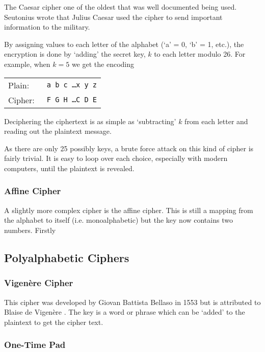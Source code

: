The Caesar cipher one of the oldest that was well documented being used. Seutonius wrote that Julius Caesar used the cipher to send important information to the military. 

By assigning values to each letter of the alphabet (`a' = 0, `b' = 1, etc.), the encryption is done by `adding' the secret key, $k$ to each letter modulo 26. For example, when $k = 5$ we get the encoding

\begin{center}
\begin{tabular}{l l}%
	Plain:  &\quad\texttt{ a b c \ldots x y z} \\ 
	Cipher: &\quad\texttt{ F G H \ldots C D E} \\
\end{tabular}
\end{center}

Deciphering the ciphertext is as simple as `subtracting' $k$ from each letter and reading out the plaintext message.

As there are only 25 possibly keys, a brute force attack on this kind of cipher is fairly trivial. It is easy to loop over each choice, especially with modern computers, until the plaintext is revealed.

\subsubsection*{Affine Cipher}

A slightly more complex cipher is the affine cipher. This is still a mapping from the alphabet to itself (i.e. monoalphabetic) but the key now contains two numbers. Firstly

\subsection{Polyalphabetic Ciphers}



\subsubsection*{Vigen\`{e}re Cipher}

This cipher was developed by Giovan Battista Bellaso in 1553 \cite{} but is attributed to Blaise de Vigen\`{e}re \cite{}. The key is a word or phrase which can be `added' to the plaintext to get the cipher text.

\subsubsection*{One-Time Pad}

